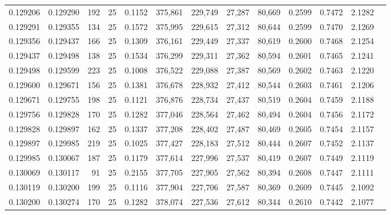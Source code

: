 \begin{tabular}{rrrrrrrrrrrrr}
0.129206 & 0.129290 &   192 &  25 &                                     0.1152 & 375,861 & 229,749 &  27,287 &  80,669 & 0.2599 & 0.7472 & 2.1282 \\
0.129291 & 0.129355 &   134 &  25 &                                     0.1572 & 375,995 & 229,615 &  27,312 &  80,644 & 0.2599 & 0.7470 & 2.1269 \\
0.129356 & 0.129437 &   166 &  25 &                                     0.1309 & 376,161 & 229,449 &  27,337 &  80,619 & 0.2600 & 0.7468 & 2.1254 \\
0.129437 & 0.129498 &   138 &  25 &                                     0.1534 & 376,299 & 229,311 &  27,362 &  80,594 & 0.2601 & 0.7465 & 2.1241 \\
0.129498 & 0.129599 &   223 &  25 &                                     0.1008 & 376,522 & 229,088 &  27,387 &  80,569 & 0.2602 & 0.7463 & 2.1220 \\
0.129600 & 0.129671 &   156 &  25 &                                     0.1381 & 376,678 & 228,932 &  27,412 &  80,544 & 0.2603 & 0.7461 & 2.1206 \\
0.129671 & 0.129755 &   198 &  25 &                                     0.1121 & 376,876 & 228,734 &  27,437 &  80,519 & 0.2604 & 0.7459 & 2.1188 \\
0.129756 & 0.129828 &   170 &  25 &                                     0.1282 & 377,046 & 228,564 &  27,462 &  80,494 & 0.2604 & 0.7456 & 2.1172 \\
0.129828 & 0.129897 &   162 &  25 &                                     0.1337 & 377,208 & 228,402 &  27,487 &  80,469 & 0.2605 & 0.7454 & 2.1157 \\
0.129897 & 0.129985 &   219 &  25 &                                     0.1025 & 377,427 & 228,183 &  27,512 &  80,444 & 0.2607 & 0.7452 & 2.1137 \\
0.129985 & 0.130067 &   187 &  25 &                                     0.1179 & 377,614 & 227,996 &  27,537 &  80,419 & 0.2607 & 0.7449 & 2.1119 \\
0.130069 & 0.130117 &    91 &  25 &                                     0.2155 & 377,705 & 227,905 &  27,562 &  80,394 & 0.2608 & 0.7447 & 2.1111 \\
0.130119 & 0.130200 &   199 &  25 &                                     0.1116 & 377,904 & 227,706 &  27,587 &  80,369 & 0.2609 & 0.7445 & 2.1092 \\
0.130200 & 0.130274 &   170 &  25 &                                     0.1282 & 378,074 & 227,536 &  27,612 &  80,344 & 0.2610 & 0.7442 & 2.1077 \\

\end{tabular}
